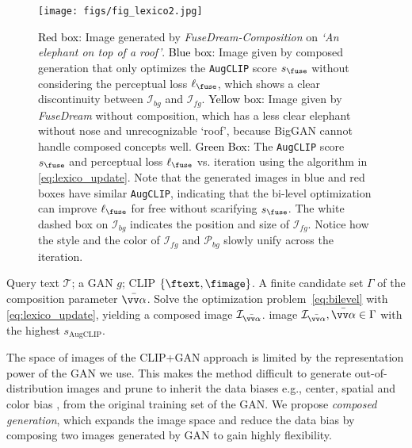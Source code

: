 \documentclass[10pt,twocolumn,letterpaper]{article}
\newcommand{\our}{\emph{FuseDream}}
\newcommand{\ganclip}{CLIP+GAN}
\newcommand{\ourloss}{\texttt{AugCLIP}}
\newcommand{\ourcomp}{\our\emph{-Composition}}
\begin{document}
\begin{figure*}
    \centering
    \texttt{[image: figs/fig\_lexico2.jpg]}
    \caption{\textcolor{black}{Red box}: Image generated by {\ourcomp} on  \emph{`An elephant on top of a roof'}. 
    \textcolor{black}{Blue box}: Image given by composed generation that only optimizes the {\ourloss} score $s_{\fuse}$ without considering the perceptual loss $\ell_{\fuse}$,  which shows a clear discontinuity between $\mathcal{I}_{bg}$ and $\mathcal{I}_{fg}$. 
\textcolor{black}{Yellow box}: Image given by {\our} without composition, 
which has a less clear elephant without nose and unrecognizable `roof', 
    because BigGAN cannot handle composed concepts well.
\textcolor{black}{Green Box}: The {\ourloss} score $s_{\fuse}$ and perceptual loss $\ell_{\fuse}$ vs. iteration using the algorithm in \eqref{eq:lexico_update}.  
    Note that the generated images in blue and red boxes have similar {\ourloss},  indicating that the bi-level optimization 
    can improve $\ell_{\fuse}$ for free without scarifying $s_{\fuse}$. 
The white dashed box on $\mathcal{I}_{bg}$ indicates the position and size of $\mathcal{I}_{fg}$.  
Notice how the style and the color of $\mathcal{I}_{fg}$ and $\mathcal{P}_{bg}$ slowly unify across the iteration. }
    \label{fig:lexico}
    \vspace{-10pt}
\end{figure*}

\begin{algorithm}[t]
\caption{{\ourcomp}}
\label{alg:fuse}
\begin{algorithmic}[1]
\STATE {} Query text $\mathcal{T}$; 
a GAN $g$; CLIP $\{\ftext, \fimage\}$. 
A finite candidate set $\Gamma$ 
of the composition parameter $\bar{\vv\alpha}$. 
\STATE Solve the optimization problem~\eqref{eq:bilevel} with \eqref{eq:lexico_update}, yielding a composed image   $\mathcal{I}_{\bar{\vv\alpha}}$.
\ENDFOR
\RETURN image $\mathcal{I}_{\bar{\vv\alpha}}, \bar{\vv\alpha}\in \Gamma$ with the highest $s_{\text{AugCLIP}}$.
\end{algorithmic}
\end{algorithm}

The space of images of the {\ganclip} approach is limited by the representation power of the GAN we use. 
This makes the method difficult to generate out-of-distribution images and 
prune to inherit the data biases 
 e.g., center, spatial and color bias \cite{anirudh2019mimicgan, huh2020transforming}, 
 from the original training set of the GAN. 
We propose \emph{composed generation}, 
which expands the image space and reduce the data bias by composing two images generated by GAN to gain highly flexibility.  
\end{document}
